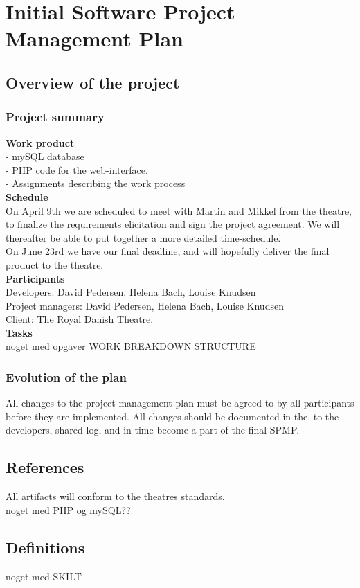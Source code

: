 \documentclass[12pt]{article}
\begin{document}
\section{Initial Software Project Management Plan}
\subsection{Overview of the project}
\subsubsection{Project summary}
\textbf{Work product} \\
- mySQL database \\
- PHP code for the web-interface. \\
- Assignments describing the work process\\
\textbf{Schedule}\\
On April 9th we are scheduled to meet with Martin and Mikkel from the theatre, to finalize the requirements elicitation and sign the project agreement. We will thereafter be able to put together a more detailed time-schedule.\\
On June 23rd we have our final deadline, and will hopefully deliver the final product to the theatre. \\
\textbf{Participants}\\
Developers: David Pedersen, Helena Bach, Louise Knudsen \\
Project managers: David Pedersen, Helena Bach, Louise Knudsen \\
Client: The Royal Danish Theatre. \\
\textbf{Tasks}\\
noget med opgaver WORK BREAKDOWN STRUCTURE
\subsubsection{Evolution of the plan}
All changes to the project management plan must be agreed to by all participants before they are implemented. All changes should be documented in the, to the developers, shared log, and in time become a part of the final SPMP.
\subsection{References}
All artifacts will conform to the theatres standards. \\
noget med PHP og mySQL??
\subsection{Definitions}
noget med SKILT
\end{document}

